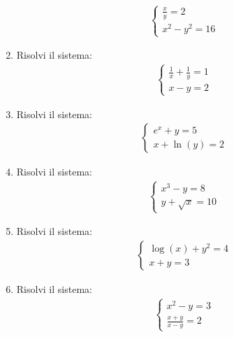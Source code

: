 \documentclass[letterpaper,10pt,italian]{jupyterBook}
\begin{document}
\begin{enumerate}
\begin{equation*}
\begin{split}
\begin{cases}
   \frac{x}{y} = 2 \\
   x^2 - y^2 = 16
   \end{cases}
   \end{split}
\end{equation*}
\item {} 
\sphinxAtStartPar
Risolvi il sistema:
\begin{equation*}
\begin{split}
   \begin{cases}
   \frac{1}{x} + \frac{1}{y} = 1 \\
   x - y = 2
   \end{cases}
   \end{split}
\end{equation*}
\item {} 
\sphinxAtStartPar
Risolvi il sistema:
\begin{equation*}
\begin{split}
   \begin{cases}
   e^x + y = 5 \\
   x + \ln(y) = 2
   \end{cases}
   \end{split}
\end{equation*}
\item {} 
\sphinxAtStartPar
Risolvi il sistema:
\begin{equation*}
\begin{split}
   \begin{cases}
   x^3 - y = 8 \\
   y + \sqrt{x} = 10
   \end{cases}
   \end{split}
\end{equation*}
\item {} 
\sphinxAtStartPar
Risolvi il sistema:
\begin{equation*}
\begin{split}
   \begin{cases}
   \log(x) + y^2 = 4 \\
   x + y = 3
   \end{cases}
   \end{split}
\end{equation*}
\item {} 
\sphinxAtStartPar
Risolvi il sistema:
\begin{equation*}
\begin{split}
    \begin{cases}
    x^2 - y = 3 \\
    \frac{x + y}{x - y} = 2

\end{cases}
\end{split}
\end{equation*}
\end{enumerate}
\end{document}
